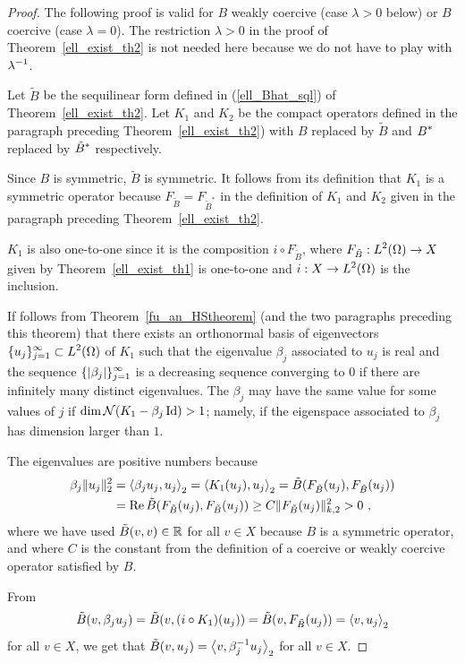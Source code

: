 \begin{proof}
The following proof is valid for $B$ weakly coercive (case $\lambda>0$
below) or $B$ coercive (case $\lambda =0$).  The restriction
$\lambda>0$ in the proof of Theorem~\ref{ell_exist_th2} is not needed
here because we do not have to play with $\displaystyle \lambda^{-1}$.

Let $\tilde{B}$ be the sequilinear form defined in (\ref{ell_Bhat_sql})
of Theorem~\ref{ell_exist_th2}.  Let $K_1$ and $K_2$ be the compact operators
defined in the paragraph preceding Theorem~\ref{ell_exist_th2}) with
$B$ replaced by $\tilde{B}$ and $\displaystyle B^\ast$ replaced by
$\displaystyle \tilde{B}^\ast$ respectively.

Since $B$ is symmetric, $\tilde{B}$ is symmetric.  It follows from its
definition that $K_1$ is a symmetric operator because
$F_{\tilde{B}} = F_{\tilde{B}^\ast}$ in the definition of $K_1$ and $K_2$
given in the paragraph preceding Theorem~\ref{ell_exist_th2}.

$K_1$ is also one-to-one since it is the composition $i \circ F_{\tilde{B}}$,
where $\displaystyle F_{\tilde{B}}:L^2(\Omega)\rightarrow X$ given by
Theorem~\ref{ell_exist_th1} is one-to-one and
$\displaystyle i:X\rightarrow L^2(\Omega)$ is the inclusion.

If follows from Theorem~\ref{fu_an_HStheorem} (and the two paragraphs
preceding this theorem) that there exists an orthonormal basis of
eigenvectors $\displaystyle \{u_j\}_{j=1}^\infty \subset L^2(\Omega)$
of $K_1$ such that the eigenvalue $\beta_j$ associated to $u_j$ is real and the
sequence $\displaystyle \{|\beta_j|\}_{j=1}^\infty$ is a decreasing sequence
converging to $0$ if there are infinitely many distinct eigenvalues.
The $\beta_j$ may have the same value for some values of $j$ if
$\dim \mathcal{N}( K_1 - \beta_j\operatorname{Id}) > 1$; namely, if the eigenspace
associated to $\beta_j$ has dimension larger than $1$.

The eigenvalues are positive numbers because
\begin{align*}
\beta_j \|u_j\|_2^2 &= \left\langle{\beta_j u_j} , {u_j}\right\rangle_2
= \left\langle{K_1(u_j)} , {u_j}\right\rangle_2 = \tilde{B}(F_{\tilde{B}}(u_j),F_{\tilde{B}}(u_j)) \\
&= \operatorname{Re} \tilde{B}(F_{\tilde{B}}(u_j),F_{\tilde{B}}(u_j))
\geq C \|F_{\tilde{B}}(u_j)\|_{k,2}^2 > 0 \ ,
\end{align*}
where we have used $\tilde{B}(v,v) \in \mathbb{R}$ for all $v \in X$
because $B$ is a symmetric operator, and where $C$ is the constant from the
definition of a coercive or weakly coercive operator satisfied by $B$.

From
\[
\tilde{B}(v, \beta_j u_j) = \tilde{B}(v, (i \circ K_1)(u_j))
= \tilde{B}(v, F_{\tilde{B}}(u_j)) = \left\langle{v} , {u_j}\right\rangle_2
\]
for all $v \in X$, we get that
$\displaystyle \tilde{B}(v, u_j) = \left\langle{v} , {\beta_j^{-1}u_j}\right\rangle_2$ for all
$v \in X$.


\end{proof}
